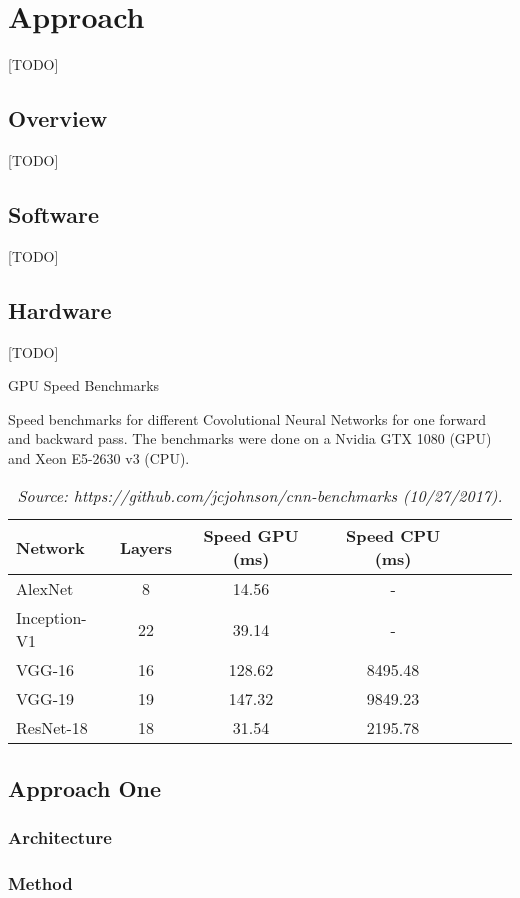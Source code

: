\section{Approach}
\label{sec:approach}
[TODO]

\subsection{Overview}
\label{approach:overview}
[TODO]


\subsection{Software}
\label{approach:software}
[TODO]

\subsection{Hardware}
\label{approach:hardware}
[TODO]

\begin{table}[H]
	\centering
	\label{table:gpu_benchmarks}
	\caption{GPU Speed Benchmarks}
	\raggedright
	Speed benchmarks for different Covolutional Neural Networks for one forward and backward pass. The benchmarks were done on a Nvidia GTX 1080 (GPU) and Xeon E5-2630 v3 (CPU).
	\caption*{\footnotesize \textit{Source: https://github.com/jcjohnson/cnn-benchmarks (10/27/2017).}}
	
	\begin{tabular}{|l|c|c|c|c|c|c|}
		
		\hline
		Network & Layers & Speed GPU (ms) & Speed CPU (ms)\\
		\hline
		AlexNet & 8 & 14.56 & - \\
		\hline
		Inception-V1 & 22 & 39.14 & - \\
		\hline
		VGG-16 & 16 & 128.62 & 8495.48  \\
		\hline
		VGG-19 & 19 & 147.32 & 9849.23 \\
		\hline
		ResNet-18 & 18 & 31.54 & 2195.78 \\
		\hline
	\end{tabular}
\end{table}


\subsection{Approach One}
\label{approach:approach_one}


\subsubsection{Architecture}
\label{architecture:approach_one}


\subsubsection{Method}
\label{method:approach_one}

